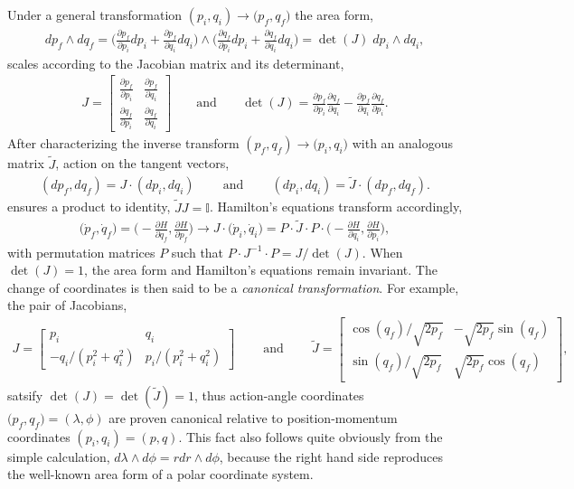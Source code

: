 \documentclass[nofootinbib,preprint]{revtex4-1}
\begin{document}
Under a general transformation $(p_i,q_i) \rightarrow \big(p_f,q_f\big)$ the area form,
\begin{eqnarray}
dp_f \wedge dq_f = \bigg(\frac{\partial p_f}{\partial  p_i}dp_i+\frac{\partial p_f}{\partial q_i}dq_i\bigg)
\wedge\bigg(\frac{\partial q_f}{\partial p_i}dp_i+\frac{\partial q_f}{\partial q_i}dq_i\bigg)
=\det(J) \; dp_i \wedge dq_i,  \nonumber
\end{eqnarray}
scales according to the Jacobian matrix and its determinant,
\begin{eqnarray}
J= \begin{bmatrix}
\frac{\partial p_f}{\partial p_i} & \frac{\partial p_f}{\partial q_i} \\
\frac{\partial q_f}{\partial p_i} & \frac{\partial q_f}{\partial q_i}
\end{bmatrix} \;\;\;\;\;\;\; \text{and} \;\;\;\;\;\;\; 
\det(J) = \frac{\partial p_f}{\partial p_i}\frac{\partial q_f}{\partial q_i}
 - \frac{\partial p_f}{\partial q_i}\frac{\partial q_f}{\partial p_i}. 
\nonumber 
\end{eqnarray}
After characterizing the inverse transform $(p_f,q_f) \rightarrow \big(p_i,q_i\big)$ 
with an analogous matrix $\widetilde{J}$, action on the tangent vectors,
\begin{eqnarray}
(dp_f,dq_f)= J \cdot (dp_i,dq_i) 
\;\;\;\;\;\;\;\; \text{and} \;\;\;\;\;\;\;\;
(dp_i,dq_i)= \widetilde{J} \cdot (dp_f,dq_f). \nonumber
\end{eqnarray}
ensures a product to identity, $\widetilde{J}J=\mathbb{I}$. Hamilton's equations 
transform accordingly,
\begin{eqnarray}
\big(\dot{p}_f,\dot{q}_f \big) = \bigg(-\frac{\partial H}{\partial q_f},\frac{\partial H}{\partial p_f}\bigg)   
\longrightarrow J \cdot \big(\dot{p}_i,\dot{q}_i \big) = 
P\cdot \widetilde{J} \cdot P \cdot \bigg(-\frac{\partial H}{\partial q_i},\frac{\partial H}{\partial p_i}\bigg),
\nonumber 
\end{eqnarray}
with permutation matrices $P$ such that $P \cdot J^{-1} \cdot P = J/\det(J)$. When 
$\det(J)=1$, the area form and Hamilton's equations remain invariant. The change of 
coordinates is then said to be a \textit{canonical transformation}. For example, the 
pair of Jacobians,
\begin{eqnarray}
J =  \begin{bmatrix} p_i & q_i \\
-q_i/(p_i^2+q_i^2) & p_i/(p_i^2+q_i^2)
\end{bmatrix}  \;\;\;\;\;\;\;\; \text{and}  \;\;\;\;\;\;\;\; 
\widetilde{J} = \begin{bmatrix} \cos(q_f)/\sqrt{2p_f} & -\sqrt{2p_f}\sin(q_f) \\
\sin(q_f)/\sqrt{2p_f} & \sqrt{2p_f}\cos(q_f) \end{bmatrix}\nonumber,
\end{eqnarray}
satsify $\det(J)=\det(\widetilde{J})=1$, thus action-angle coordinates 
$(p_f,q_f\big)=(\lambda,\phi)$ are proven canonical relative to position-momentum 
coordinates $(p_i,q_i)=(p,q)$. This fact also follows quite 
obviously from the simple calculation, $d\lambda \wedge d\phi = r dr\wedge d\phi$, 
because the right hand side reproduces the well-known area form of a polar 
coordinate system.
\end{document}

